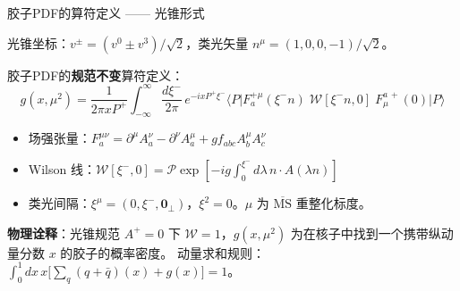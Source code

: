 \documentclass[10pt,aspectratio=169]{beamer}
\newcommand{\msbar}{\overline{\mathrm{MS}}}
\begin{document}
\begin{frame}{胶子PDF的算符定义 —— 光锥形式}

  光锥坐标：$v^\pm = (v^0 \pm v^3)/\sqrt{2}$，类光矢量 $n^\mu = (1,0,0,-1)/\sqrt{2}$。

  胶子PDF的\textbf{规范不变}算符定义：
  \begin{equation}
    \boxed{
      g(x, \mu^2) = \frac{1}{2\pi x P^+}
      \int_{-\infty}^{\infty} \frac{d\xi^{-}}{2\pi}\,
      e^{-i x P^+ \xi^{-}}
      \big\langle P \big|
      F_a^{+\mu}(\xi^{-} n)\;
      \mathcal{W}[\xi^{-} n, 0]\;
      F_{\mu}^{a\,+}(0)
      \big| P \big\rangle
    }
  \end{equation}

  \begin{itemize}
    \item 场强张量：$F_a^{\mu\nu} = \partial^\mu A_a^\nu - \partial^\nu A_a^\mu + g f_{abc} A_b^\mu A_c^\nu$
    \item Wilson 线：$\mathcal{W}[\xi^{-}, 0] = \mathcal{P}\exp[-ig \int_0^{\xi^{-}} d\lambda\, n\cdot A(\lambda n)]$
    \item 类光间隔：$\xi^\mu = (0, \xi^{-}, \mathbf{0}_\perp)$，$\xi^2 = 0$。$\mu$ 为 $\msbar$ 重整化标度。
  \end{itemize}

  \textbf{物理诠释}：光锥规范 $A^+ = 0$ 下 $\mathcal{W} = 1$，$g(x,\mu^2)$ 为在核子中找到一个携带纵动量分数 $x$ 的胶子的概率密度。
  动量求和规则：$\int_0^1 dx\,x\big[\sum_q (q+\bar{q})(x) + g(x)\big] = 1$。
\end{frame}
\end{document}
